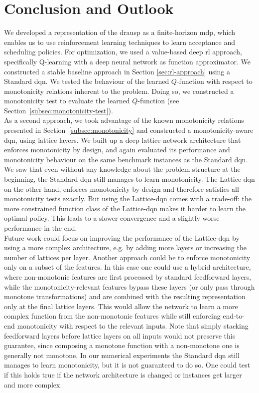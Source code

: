 \section{Conclusion and Outlook}
\label{sec:conclusion}

We developed a representation of the \acs{drausp} as a finite-horizon \acs{mdp}, which enables us
to use reinforcement learning techniques to learn acceptance and scheduling policies. For optimization, we used
a value-based deep \acs{rl} approach, specifically Q-learning with a deep neural network as function approximator.
We constructed a stable baseline approach in Section \ref{sec:rl-approach} using a Standard \acs{dqn}. We
tested the behaviour of the learned $Q$-function with respect to monotonicity relations inherent to the problem.
Doing so, we constructed a monotonicity test to evaluate the learned $Q$-function (see Section~\ref{subsec:monotonicity-test}).\\
As a second approach, we took advantage of the known monotonicity relations presented in Section~\ref{subsec:monotonicity}
and constructed a monotonicity-aware \acs{dqn}, using lattice layers. We built up a deep lattice
network architecture that enforces monotonicity by design, and again evaluated its performance 
and monotonicity behaviour on the same benchmark instances as the Standard \acs{dqn}.\\
We saw that even without any knowledge about the problem structure at the beginning, the
Standard \acs{dqn} still manages to learn monotonicity. The Lattice-\acs{dqn} 
on the other hand, enforces monotonicity by design and therefore satisfies all monotonicity tests exactly. 
But using the Lattice-\acs{dqn} comes with a trade-off: the more constrained function class of the Lattice-\acs{dqn}
makes it harder to learn the optimal policy. This leads to a slower convergence and a slightly worse performance in the end.\\

Future work could focus on improving the performance of the Lattice-\acs{dqn} by using a more complex architecture, e.g. by
adding more layers or increasing the number of lattices per layer. Another approach could be to enforce monotonicity only on a subset of the features.
In this case one could use a hybrid architecture,
where non-monotonic features are first processed by standard feedforward layers, while the monotonicity-relevant features
bypass these layers (or only pass through monotone transformations) and are combined with the resulting representation only
at the final lattice layers. This would allow the network to learn a more complex function from the non-monotonic features
while still enforcing end-to-end monotonicity with respect to the relevant inputs. Note that simply stacking feedforward
layers before lattice layers on all inputs would not preserve this guarantee, since composing a monotone function with a
non-monotone one is generally not monotone.
In our numerical experiments the Standard \acs{dqn} still manages to learn monotonicity, but it is not guaranteed to do so.
One could test if this holds true if the network architecture is changed or instances get larger and more complex.